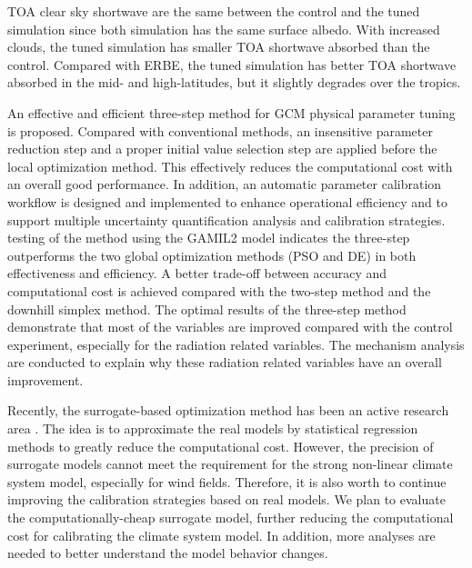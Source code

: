 \documentclass[gmd, manuscript]{copernicus}
\begin{document}
TOA clear sky shortwave are the same between the control and the tuned simulation since both simulation has the same surface albedo. With increased clouds, the tuned simulation has smaller TOA shortwave absorbed than the control. Compared with ERBE, the tuned simulation has better TOA shortwave absorbed in the mid- and high-latitudes, but it slightly degrades over the tropics.  



\conclusions  %

An effective and efficient three-step method for GCM physical parameter tuning is proposed. Compared with conventional methods, an insensitive parameter reduction step and a proper initial value selection step are applied before the local optimization method. This effectively reduces the computational cost with an overall good performance.    In addition, an automatic parameter calibration workflow is designed and implemented to enhance operational efficiency and to support multiple uncertainty quantification analysis and calibration strategies. testing of the method using the GAMIL2 model indicates the three-step outperforms the two global optimization methods (PSO and DE) in both effectiveness and efficiency.  A better trade-off between accuracy and computational cost is achieved compared with the two-step method and the downhill simplex method. The optimal results of the three-step method demonstrate that most of the variables are improved compared with the control experiment, especially for the radiation related variables. The mechanism analysis are conducted to explain why these radiation related variables have an overall improvement.

Recently, the surrogate-based optimization method has been an active research area . The idea is to  approximate the real models by  statistical regression methods to greatly reduce the computational cost. However, the precision of surrogate models cannot meet the requirement for the strong non-linear climate system model, especially for wind fields. Therefore, it is also worth to continue improving the calibration strategies based on real models. We plan to evaluate the computationally-cheap surrogate model, further reducing the computational cost for calibrating the climate system model. In addition, more analyses are needed to better understand the model behavior changes.

 
\end{document}
